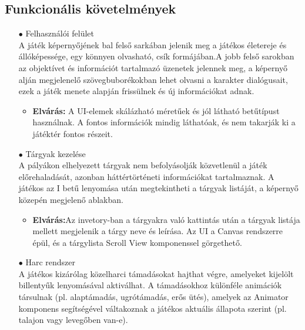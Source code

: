 \documentclass[
]{thesis-ekf}
\theoremstyle{definition}
\theoremstyle{remark}
\begin{document}
\subsection{Funkcionális követelmények}
\begin{itemize}
	\item[$\bullet$] Felhasználói felület \\A játék képernyőjének bal felső sarkában jelenik meg a játékos életereje és állóképessége, egy könnyen olvasható, csík formájában.A jobb felső sarokban az objektívet és információt tartalmazó üzenetek jelennek meg, a képernyő alján megjelenelő szövegbuborékokban lehet olvasni a karakter dialógusait, ezek a játék menete alapján frissülnek és új információkat adnak.
	\begin{itemize}
		\item \textbf{Elvárás:} A UI-elemek skálázható méretűek és jól látható betűtípust használnak. A fontos információk mindig láthatóak, és nem takarják ki a játéktér fontos részeit.
	\end{itemize}
	\item[$\bullet$]Tárgyak kezelése\\A pályákon elhelyezett tárgyak nem befolyásolják közvetlenül a játék előrehaladását, azonban háttértörténeti információkat tartalmaznak. A játékos az I betű lenyomása után megtekintheti a tárgyak listáját, a képernyő közepén megjelenő ablakban.
	\begin{itemize}
		\item \textbf{Elvárás:}Az invetory-ban a tárgyakra való kattintás után a tárgyak listája mellett megjelenik a tárgy neve és leírása. Az UI a Canvas rendszerre épül, és a tárgylista Scroll View komponenssel görgethető.
	\end{itemize}
	\item[$\bullet$] Harc rendszer\\ A játékos kizárólag közelharci támadásokat hajthat végre, amelyeket
	kijelölt billentyűk lenyomásával aktiválhat. A támadásokhoz különféle animációk társulnak (pl. alaptámadás, ugrótámadás, erős ütés), amelyek az Animator komponens segítségével váltakoznak a játékos aktuális állapota szerint (pl. talajon vagy levegőben van-e).
	

\end{itemize}
\end{document}
